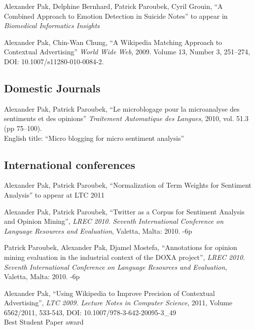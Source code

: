 \documentclass[letterpaper]{article}
\renewenvironment{itemize}{
  \begin{list}{}{
    \setlength{\leftmargin}{0.6em}
  }
}{
  \end{list}
}
\begin{document}
\begin{itemize}

\item Alexander Pak, Delphine Bernhard, Patrick Paroubek, Cyril Grouin, ``A Combined Approach to Emotion Detection in Suicide Notes'' to appear in {\it Biomedical Informatics Insights}

\item Alexander Pak, Chin-Wan Chung, ``A Wikipedia Matching Approach to Contextual
Advertising'' {\it World Wide Web}, 2009. Volume 13, Number 3, 251--274, DOI:
10.1007/s11280-010-0084-2.

\end{itemize}

\subsection*{Domestic Journals}

\begin{itemize}
\item Alexander Pak, Patrick Paroubek, ``Le microblogage pour la microanalyse des
sentiments et des opinions'' {\it Traitement Automatique des Langues}, 2010, vol. 51.3 (pp 75--100).\\
English title: ``Micro blogging for micro sentiment analysis''
\end{itemize}


\subsection*{International conferences}

\begin{itemize}

\item Alexander Pak, Patrick Paroubek, ``Normalization of Term Weights for Sentiment Analysis'' to appear at LTC 2011

\item Alexander Pak, Patrick Paroubek, ``Twitter as a Corpus for Sentiment Analysis and Opinion Mining'', 
{\it LREC 2010. Seventh International Conference on Language Resources and Evaluation}, 
Valetta, Malta: 2010. -6p

\item Patrick Paroubek, Alexander Pak, Djamel Mostefa, ``Annotations for opinion mining evaluation in the industrial context of the DOXA project'', 
{\it LREC 2010. Seventh International Conference on Language Resources and Evaluation}, 
Valetta, Malta: 2010. -6p

\item Alexander Pak, ``Using Wikipedia to Improve Precision of Contextual Advertising'', {\it LTC 2009. Lecture Notes in Computer Science}, 
2011, Volume 6562/2011, 533-543, DOI: 10.1007/978-3-642-20095-3\_49\\
Best Student Paper award

\end{itemize}
\end{document}
